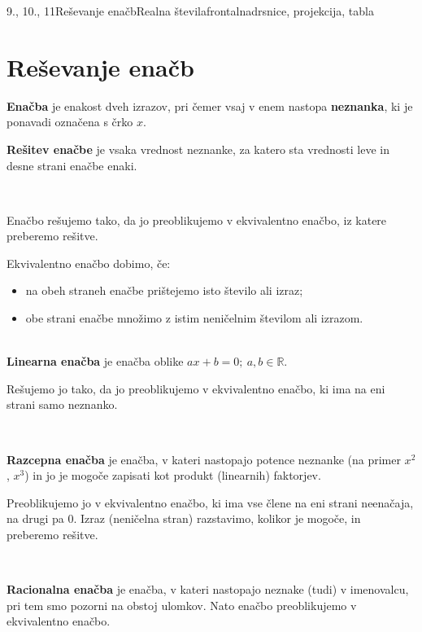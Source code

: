 \begin{priprava}{9., 10., 11}{}{Reševanje enačb}{Realna števila}{frontalna}{drsnice, projekcija, tabla}
    
    \section{Reševanje enačb}

        
                \textbf{Enačba} je enakost dveh izrazov, pri čemer vsaj v enem nastopa \textbf{neznanka}, ki je ponavadi označena s črko $x$.

                \textbf{Rešitev enačbe} je vsaka vrednost neznanke, za katero sta vrednosti leve in desne strani enačbe enaki.
            
~

                Enačbo rešujemo tako, da jo preoblikujemo v ekvivalentno enačbo, iz katere preberemo rešitve.

                Ekvivalentno enačbo dobimo, če:
                \begin{itemize}
                    \item na obeh straneh enačbe prištejemo isto število ali izraz;
                    \item obe strani enačbe množimo z istim neničelnim številom ali izrazom.
                \end{itemize}
            
        
                ~~\\
        
                \textbf{Linearna enačba} je enačba oblike $ax+b=0;~a,b\in\mathbb{R}$.

                Rešujemo jo tako, da jo preoblikujemo v ekvivalentno enačbo, ki ima na eni strani samo neznanko.
            
~~

                \textbf{Razcepna enačba} je enačba, v kateri nastopajo potence neznanke (na primer $x^2$, $x^3$) in jo je mogoče zapisati kot produkt (linearnih) faktorjev.

                Preoblikujemo jo v ekvivalentno enačbo, ki ima vse člene na eni strani neenačaja, na drugi pa $0$. 
                Izraz (neničelna stran) razstavimo, kolikor je mogoče, in preberemo rešitve.
            
~~

                \textbf{Racionalna enačba} je enačba, v kateri nastopajo neznake (tudi) v imenovalcu, pri tem smo pozorni na obstoj ulomkov. 
                Nato enačbo preoblikujemo v ekvivalentno enačbo.
            


\end{priprava}
